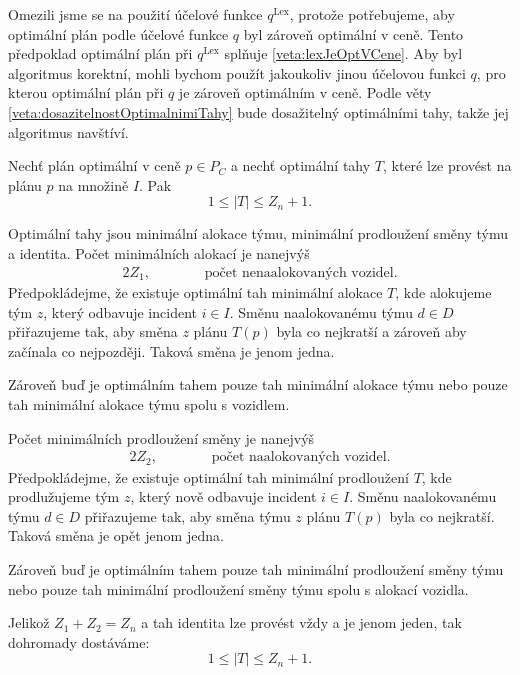 Omezili jsme se na použití účelové funkce $q^{\text{Lex}}$, protože potřebujeme, aby optimální plán podle účelové funkce $q$ byl zároveň optimální v ceně.
Tento předpoklad optimální plán při $q^{\text{Lex}}$ splňuje \ref{veta:lexJeOptVCene}.
Aby byl algoritmus korektní, mohli bychom použít jakoukoliv jinou účelovou funkci $q$, pro kterou optimální plán při $q$ je zároveň optimálním v ceně.
Podle věty \ref{veta:dosazitelnostOptimalnimiTahy} bude dosažitelný optimálními tahy, takže jej algoritmus navštíví.

\begin{veta}\label{veta:pocetOptTahu}
  Nechť plán optimální v ceně $p \in P_C$ a nechť optimální tahy $T$, které lze provést na plánu $p$ na množině $I$.
  Pak
  \begin{equation*}
    1 \leq |T| \leq Z_n + 1.
  \end{equation*}
\end{veta}
\begin{dukaz}
  Optimální tahy jsou minimální alokace týmu, minimální prodloužení směny týmu a identita.
  Počet minimálních alokací je nanejvýš
  \begin{alignat*}{2}
    Z_1, \quad && \hspace{15pt} \text{počet nenaalokovaných vozidel.}
  \end{alignat*}
  Předpokládejme, že existuje optimální tah minimální alokace $T$, kde alokujeme tým $z$, který odbavuje incident $i \in I$.
  Směnu naalokovanému týmu $d \in D$ přiřazujeme tak, aby směna $z$ plánu $T(p)$ byla co nejkratší a zároveň aby začínala co nejpozději.
  Taková směna je jenom jedna.

  Zároveň buď je optimálním tahem pouze tah minimální alokace týmu nebo pouze tah minimální alokace týmu spolu s vozidlem.

  Počet minimálních prodloužení směny je nanejvýš
  \begin{alignat*}{2}
    Z_2, \quad && \hspace{15pt} \text{počet naalokovaných vozidel.}
  \end{alignat*}
  Předpokládejme, že existuje optimální tah minimální prodloužení $T$, kde prodlužujeme tým $z$, který nově odbavuje incident $i \in I$.
  Směnu naalokovanému týmu $d \in D$ přiřazujeme tak, aby směna týmu $z$ plánu $T(p)$ byla co nejkratší.
  Taková směna je opět jenom jedna.

  Zároveň buď je optimálním tahem pouze tah minimální prodloužení směny týmu nebo pouze tah minimální prodloužení směny týmu spolu s alokací vozidla.

  Jelikož $Z_1 + Z_2 = Z_n$ a tah identita lze provést vždy a je jenom jeden, tak dohromady dostáváme:
  \begin{equation*}
    1 \leq |T| \leq Z_n + 1.
  \end{equation*}
\end{dukaz}

